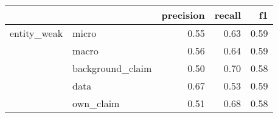 \begin{tabular}{llrrr}
\toprule
            &           &  precision &  recall &   f1 \\
\midrule
entity\_weak & micro &       0.55 &    0.63 & 0.59 \\
            & macro &       0.56 &    0.64 & 0.59 \\
            & background\_claim &       0.50 &    0.70 & 0.58 \\
            & data &       0.67 &    0.53 & 0.59 \\
            & own\_claim &       0.51 &    0.68 & 0.58 \\
\bottomrule
\end{tabular}
